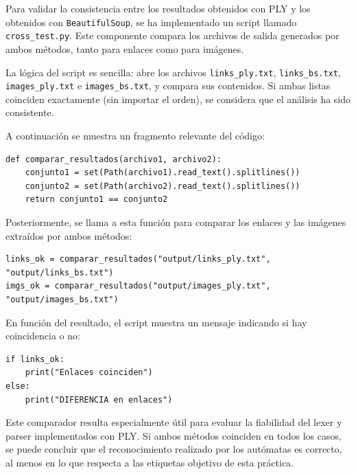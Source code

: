 \documentclass[11pt,a4paper]{article}
\begin{document}
Para validar la consistencia entre los resultados obtenidos con PLY y los obtenidos con \texttt{BeautifulSoup}, se ha implementado un script llamado \texttt{cross\_test.py}. Este componente compara los archivos de salida generados por ambos métodos, tanto para enlaces como para imágenes.

\medskip

La lógica del script es sencilla: abre los archivos \texttt{links\_ply.txt}, \texttt{links\_bs.txt}, \texttt{images\_ply.txt} e \texttt{images\_bs.txt}, y compara sus contenidos. Si ambas listas coinciden exactamente (sin importar el orden), se considera que el análisis ha sido consistente.

\medskip

A continuación se muestra un fragmento relevante del código:

\begin{verbatim}
def comparar_resultados(archivo1, archivo2):
    conjunto1 = set(Path(archivo1).read_text().splitlines())
    conjunto2 = set(Path(archivo2).read_text().splitlines())
    return conjunto1 == conjunto2
\end{verbatim}

\medskip

Posteriormente, se llama a esta función para comparar los enlaces y las imágenes extraídos por ambos métodos:

\begin{verbatim}
links_ok = comparar_resultados("output/links_ply.txt", "output/links_bs.txt")
imgs_ok = comparar_resultados("output/images_ply.txt", "output/images_bs.txt")
\end{verbatim}

En función del resultado, el script muestra un mensaje indicando si hay coincidencia o no:

\begin{verbatim}
if links_ok:
    print("Enlaces coinciden")
else:
    print("DIFERENCIA en enlaces")
\end{verbatim}

\medskip

Este comparador resulta especialmente útil para evaluar la fiabilidad del lexer y parser implementados con PLY. Si ambos métodos coinciden en todos los casos, se puede concluir que el reconocimiento realizado por los autómatas es correcto, al menos en lo que respecta a las etiquetas objetivo de esta práctica.
\end{document}
